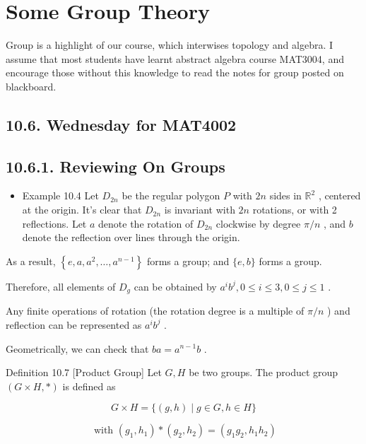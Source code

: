 

\chapter{Some Group Theory}

Group is a highlight of our course, which interwises topology and algebra. I assume that most students have learnt abstract algebra course MAT3004, and encourage those without this knowledge to read the notes for group posted on blackboard.

\section*{10.6. Wednesday for MAT4002}

\section*{10.6.1. Reviewing On Groups}

\begin{itemize}
\item Example 10.4 Let \({D}_{2n}\) be the regular polygon \(P\) with \({2n}\) sides in \({\mathbb{R}}^{2}\) , centered at the origin. It’s clear that \({D}_{2n}\) is invariant with \({2n}\) rotations, or with 2 reflections. Let \(a\) denote the rotation of \({D}_{2n}\) clockwise by degree \(\pi /n\) , and \(b\) denote the reflection over lines through the origin.
\end{itemize}

As a result, \(\left\{  {e,a,{a}^{2},\ldots ,{a}^{n - 1}}\right\}\) forms a group; and \(\{ e,b\}\) forms a group.

Therefore, all elements of \({D}_{g}\) can be obtained by \({a}^{i}{b}^{j},0 \leq  i \leq  3,0 \leq  j \leq  1\) .

Any finite operations of rotation (the rotation degree is a multiple of \(\pi /n\) ) and reflection can be represented as \({a}^{i}{b}^{j}\) .

Geometrically, we can check that \({ba} = {a}^{n - 1}b\) .

Definition 10.7 [Product Group] Let \(G,H\) be two groups. The product group \(\left( {G \times  H, * }\right)\) is defined as

\[
G \times  H = \{ \left( {g,h}\right)  \mid  g \in  G,h \in  H\}
\]

\[
\text{ with }\left( {{g}_{1},{h}_{1}}\right)  * \left( {{g}_{2},{h}_{2}}\right)  = \left( {{g}_{1}{g}_{2},{h}_{1}{h}_{2}}\right)
\]

